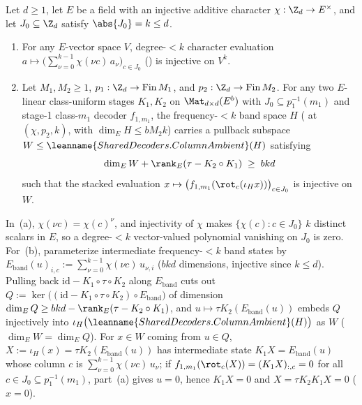 \begin{lemma}\label{lem:vandermonde-subset}
Let $d \ge 1$, let $E$ be a field with an injective additive character $\chi : \Z_d \to E^\times$, and
let $J_0 \subseteq \Z_d$ satisfy $\abs{J_0} = k \le d$.
\begin{enumerate}[label=(\alph*)]
\item For any $E$-vector space $V$, degree-$< k$ character evaluation
  $a \mapsto \bigl(\sum_{\nu=0}^{k-1} \chi(\nu c)\,a_\nu\bigr)_{c \in J_0}$
  () is injective on $V^k$.
\item Let $M_1, M_2 \ge 1$, $p_1 : \Z_d \to \mathrm{Fin}\,M_1$, and
  $p_2 : \Z_d \to \mathrm{Fin}\,M_2$. For any two $E$-linear class-uniform stages $K_1, K_2$ on
  $\Mat_{d\times d}(E^b)$ with $J_0 \subseteq p_1^{-1}(m_1)$ and stage-1 class-$m_1$ decoder
  $f_{1,m_1}$, the frequency-$< k$ band space $H$ ( at
  $(\chi, p_2, k)$, with $\dim_E H \le b M_2 k$) carries a pullback subspace
  $W \le \leanname{SharedDecoders.ColumnAmbient}(H)$ satisfying
  \[
    \dim_E W + \rank_E(\tau - K_2 \circ K_1) \;\ge\; b k d
  \]
  such that the stacked evaluation $x \mapsto \bigl(f_{1,m_1}(\rot_c(\iota_H x))\bigr)_{c \in J_0}$
  is injective on $W$.
\end{enumerate}
\end{lemma}
\begin{outline}
In~(a), $\chi(\nu c) = \chi(c)^\nu$, and injectivity of $\chi$ makes $\{\chi(c) : c \in J_0\}$
$k$ distinct scalars in $E$, so a degree-$< k$ vector-valued polynomial vanishing on $J_0$ is zero.
For~(b), parameterize intermediate frequency-$< k$ band states by
$E_{\mathrm{band}}(u)_{i, c} := \sum_{\nu=0}^{k-1} \chi(\nu c)\,u_{\nu, i}$ ($b k d$ dimensions,
injective since $k \le d$). Pulling back $\mathrm{id} - K_1 \circ \tau \circ K_2$ along
$E_{\mathrm{band}}$ cuts out $Q := \ker\bigl((\mathrm{id} - K_1 \circ \tau \circ K_2) \circ
E_{\mathrm{band}}\bigr)$ of dimension $\dim_E Q \ge b k d - \rank_E(\tau - K_2 \circ K_1)$, and
$u \mapsto \tau K_2(E_{\mathrm{band}}(u))$ embeds $Q$ injectively into
$\iota_H\bigl(\leanname{SharedDecoders.ColumnAmbient}(H)\bigr)$ as $W$ ($\dim_E W = \dim_E Q$). For
$x \in W$ coming from $u \in Q$, $X := \iota_H(x) = \tau K_2(E_{\mathrm{band}}(u))$ has intermediate
state $K_1 X = E_{\mathrm{band}}(u)$ whose column $c$ is $\sum_{\nu=0}^{k-1} \chi(\nu c)\,u_\nu$; if
$f_{1,m_1}(\rot_c(X)) = (K_1 X)_{:,c} = 0$ for all $c \in J_0 \subseteq p_1^{-1}(m_1)$, part~(a)
gives $u = 0$, hence $K_1 X = 0$ and $X = \tau K_2 K_1 X = 0$ ($x = 0$).
\end{outline}

